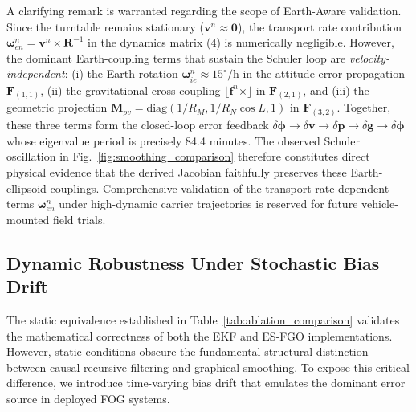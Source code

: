 \documentclass[journal]{IEEEtran}
\begin{document}
	A clarifying remark is warranted regarding the scope of Earth-Aware validation. Since the turntable remains stationary ($\bm{v}^n \approx \bm{0}$), the transport rate contribution $\bm{\omega}_{en}^n = \bm{v}^n \times \bm{R}^{-1}$ in the dynamics matrix (4) is numerically negligible. However, the dominant Earth-coupling terms that sustain the Schuler loop are \textit{velocity-independent}: (i) the Earth rotation $\bm{\omega}_{ie}^n \approx 15^\circ/\text{h}$ in the attitude error propagation $\bm{F}_{(1,1)}$, (ii) the gravitational cross-coupling $\lfloor \bm{f}^n \times \rfloor$ in $\bm{F}_{(2,1)}$, and (iii) the geometric projection $\bm{M}_{pv} = \text{diag}(1/R_M, 1/R_N\cos L, 1)$ in $\bm{F}_{(3,2)}$. Together, these three terms form the closed-loop error feedback $\delta \bm{\phi} \to \delta \bm{v} \to \delta \bm{p} \to \delta \bm{g} \to \delta \bm{\phi}$ whose eigenvalue period is precisely 84.4 minutes. The observed Schuler oscillation in Fig.~\ref{fig:smoothing_comparison} therefore constitutes direct physical evidence that the derived Jacobian faithfully preserves these Earth-ellipsoid couplings. Comprehensive validation of the transport-rate-dependent terms $\bm{\omega}_{en}^n$ under high-dynamic carrier trajectories is reserved for future vehicle-mounted field trials.
	
	\subsection{Dynamic Robustness Under Stochastic Bias Drift}
	The static equivalence established in Table~\ref{tab:ablation_comparison} validates the mathematical correctness of both the EKF and ES-FGO implementations. However, static conditions obscure the fundamental structural distinction between causal recursive filtering and graphical smoothing. To expose this critical difference, we introduce time-varying bias drift that emulates the dominant error source in deployed FOG systems.
	
\end{document}
